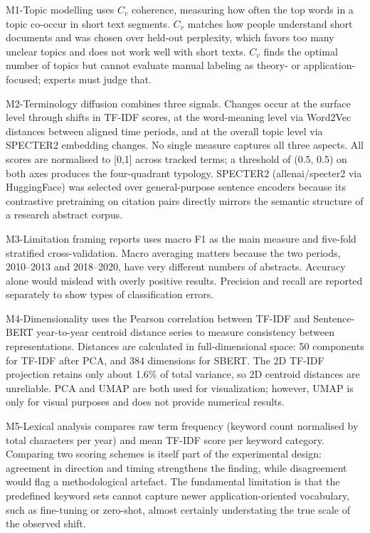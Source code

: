 M1-Topic modelling uses $C_v$ coherence, measuring how often the top words in a topic co-occur in short text segments. $C_v$ matches how people understand short documents and was chosen over held-out perplexity, which favors too many unclear topics and does not work well with short texts. $C_v$ finds the optimal number of topics but cannot evaluate manual labeling as theory- or application-focused; experts must judge that.

M2-Terminology diffusion combines three signals. Changes occur at the surface level through shifts in TF-IDF scores, at the word-meaning level via Word2Vec distances between aligned time periods, and at the overall topic level via SPECTER2 embedding changes. No single measure captures all three aspects. All scores are normalised to [0,1] across tracked terms; a threshold of (0.5, 0.5) on both axes produces the four-quadrant typology. SPECTER2 (allenai/specter2 via HuggingFace) was selected over general-purpose sentence encoders because its contrastive pretraining on citation pairs directly mirrors the semantic structure of a research abstract corpus.

M3-Limitation framing reports uses macro F1 as the main measure and five-fold stratified cross-validation. Macro averaging matters because the two periods, 2010–2013 and 2018–2020, have very different numbers of abstracts. Accuracy alone would mislead with overly positive results. Precision and recall are reported separately to show types of classification errors.

M4-Dimensionality uses the Pearson correlation between TF-IDF and Sentence-BERT year-to-year centroid distance series to measure consistency between representations. Distances are calculated in full-dimensional space: 50 components for TF-IDF after PCA, and 384 dimensions for SBERT. The 2D TF-IDF projection retains only about 1.6\% of total variance, so 2D centroid distances are unreliable. PCA and UMAP are both used for visualization; however, UMAP is only for visual purposes and does not provide numerical results.

M5-Lexical analysis compares raw term frequency (keyword count normalised by total characters per year) and mean TF-IDF score per keyword category. Comparing two scoring schemes is itself part of the experimental design: agreement in direction and timing strengthens the finding, while disagreement would flag a methodological artefact. The fundamental limitation is that the predefined keyword sets cannot capture newer application-oriented vocabulary, such as fine-tuning or zero-shot, almost certainly understating the true scale of the observed shift.

